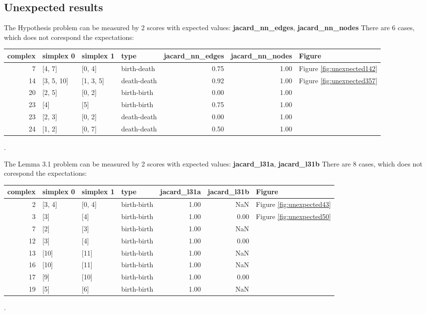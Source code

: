 \documentclass{article}
\begin{document}
\subsection{Unexpected results}

\par The Hypothesis problem can be measured by 2 scores with expected
values: \textbf{jacard\_nn\_edges}, \textbf{jacard\_nn\_nodes}
There are 6 cases, which does not corespond the expectations:
\begin{center}
\begin{tabular}{rlllrrl}
\toprule
complex & simplex 0 & simplex 1 & type & jacard\_nn\_edges & jacard\_nn\_nodes & Figure \\
\midrule
7 & [4, 7] & [0, 4] & birth-death & 0.75 & 1.00 & Figure \ref{fig:unexpected142} \\
14 & [3, 5, 10] & [1, 3, 5] & death-death & 0.92 & 1.00 & Figure \ref{fig:unexpected357} \\
20 & [2, 5] & [0, 2] & birth-birth & 0.00 & 1.00 &  \\
23 & [4] & [5] & birth-birth & 0.75 & 1.00 &  \\
23 & [2, 3] & [0, 2] & death-death & 0.00 & 1.00 &  \\
24 & [1, 2] & [0, 7] & death-death & 0.50 & 1.00 &  \\
\bottomrule
\end{tabular}
\end{center}.

\par The Lemma 3.1 problem can be measured by 2 scores with expected
values: \textbf{jacard\_l31a}, \textbf{jacard\_l31b}
There are 8 cases, which does not corespond the expectations:
\begin{center}
\begin{tabular}{rlllrrl}
\toprule
complex & simplex 0 & simplex 1 & type & jacard\_l31a & jacard\_l31b & Figure \\
\midrule
2 & [3, 4] & [0, 4] & birth-birth & 1.00 & NaN & Figure \ref{fig:unexpected43} \\
3 & [3] & [4] & birth-birth & 1.00 & 0.00 & Figure \ref{fig:unexpected50} \\
7 & [2] & [3] & birth-birth & 1.00 & NaN &  \\
12 & [3] & [4] & birth-birth & 1.00 & 0.00 &  \\
13 & [10] & [11] & birth-birth & 1.00 & NaN &  \\
16 & [10] & [11] & birth-birth & 1.00 & NaN &  \\
17 & [9] & [10] & birth-birth & 1.00 & 0.00 &  \\
19 & [5] & [6] & birth-birth & 1.00 & NaN &  \\
\bottomrule
\end{tabular}
\end{center}.
\end{document}

